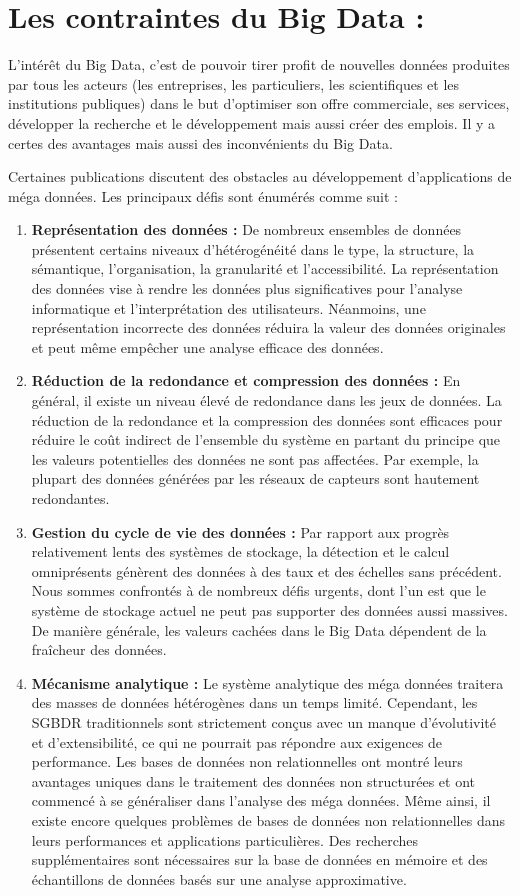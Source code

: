 \section{Les contraintes du Big Data :}

L'intérêt du Big Data, c'est de pouvoir tirer profit de nouvelles données produites par tous les acteurs (les entreprises, les particuliers, les scientifiques et les institutions publiques) dans le but d'optimiser son offre commerciale, ses services, développer la recherche et le développement mais aussi créer des emplois. Il y a certes des avantages mais aussi des inconvénients du Big Data.

Certaines publications discutent des obstacles au développement d'applications de méga données. Les principaux défis sont énumérés comme suit :

\begin{enumerate}[label=\protect\ding{\value*}, start=182]
\item \textbf{Représentation des données :} De nombreux ensembles de données présentent certains niveaux d'hétérogénéité dans le type, la structure, la sémantique, l'organisation, la granularité et l'accessibilité. La représentation des données vise à rendre les données plus significatives pour l'analyse informatique et l'interprétation des utilisateurs. Néanmoins, une représentation incorrecte des données réduira la valeur des données originales et peut même empêcher une analyse efficace des données.
\item \textbf{Réduction de la redondance et compression des données :} En général, il existe un niveau élevé de redondance dans les jeux de données. La réduction de la redondance et la compression des données sont efficaces pour réduire le coût indirect de l'ensemble du système en partant du principe que les valeurs potentielles des données ne sont pas affectées. Par exemple, la plupart des données générées par les réseaux de capteurs sont hautement redondantes.
\item \textbf{Gestion du cycle de vie des données :} Par rapport aux progrès relativement lents des systèmes de stockage, la détection et le calcul omniprésents génèrent des données à des taux et des échelles sans précédent. Nous sommes confrontés à de nombreux défis urgents, dont l'un est que le système de stockage actuel ne peut pas supporter des données aussi massives. De manière générale, les valeurs cachées dans le Big Data dépendent de la fraîcheur des données.
\item \textbf{Mécanisme analytique :} Le système analytique des méga données traitera des masses de données hétérogènes dans un temps limité. Cependant, les SGBDR traditionnels sont strictement conçus avec un manque d'évolutivité et d'extensibilité, ce qui ne pourrait pas répondre aux exigences de performance. Les bases de données non relationnelles ont montré leurs avantages uniques dans le traitement des données non structurées et ont commencé à se généraliser dans l'analyse des méga données. Même ainsi, il existe encore quelques problèmes de bases de données non relationnelles dans leurs performances et applications particulières. Des recherches supplémentaires sont nécessaires sur la base de données en mémoire et des échantillons de données basés sur une analyse approximative.

\end{enumerate}
